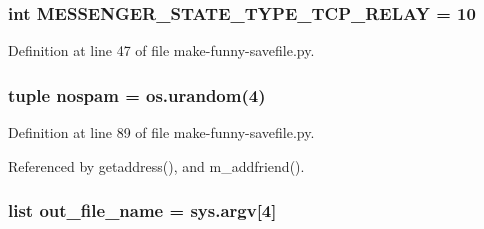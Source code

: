 \hypertarget{namespacemake-funny-savefile_a01bd5cc6ed5218a91723c2c1cca96a2d}{
\subsubsection[{M\+E\+S\+S\+E\+N\+G\+E\+R\+\_\+\+S\+T\+A\+T\+E\+\_\+\+T\+Y\+P\+E\+\_\+\+T\+C\+P\+\_\+\+R\+E\+L\+A\+Y}]{\setlength{\rightskip}{0pt plus 5cm}int M\+E\+S\+S\+E\+N\+G\+E\+R\+\_\+\+S\+T\+A\+T\+E\+\_\+\+T\+Y\+P\+E\+\_\+\+T\+C\+P\+\_\+\+R\+E\+L\+A\+Y = 10}}\label{namespacemake-funny-savefile_a01bd5cc6ed5218a91723c2c1cca96a2d}


Definition at line 47 of file make-\/funny-\/savefile.\+py.

\hypertarget{namespacemake-funny-savefile_a2581b35f119a2bbce475223789ed742c}{
\subsubsection[{nospam}]{\setlength{\rightskip}{0pt plus 5cm}tuple nospam = os.\+urandom(4)}}\label{namespacemake-funny-savefile_a2581b35f119a2bbce475223789ed742c}


Definition at line 89 of file make-\/funny-\/savefile.\+py.



Referenced by getaddress(), and m\+\_\+addfriend().

\hypertarget{namespacemake-funny-savefile_a9d9b61e68e45b3a112225bdb23f9cc19}{
\subsubsection[{out\+\_\+file\+\_\+name}]{\setlength{\rightskip}{0pt plus 5cm}list out\+\_\+file\+\_\+name = sys.\+argv\mbox{[}4\mbox{]}}}\label{namespacemake-funny-savefile_a9d9b61e68e45b3a112225bdb23f9cc19}


